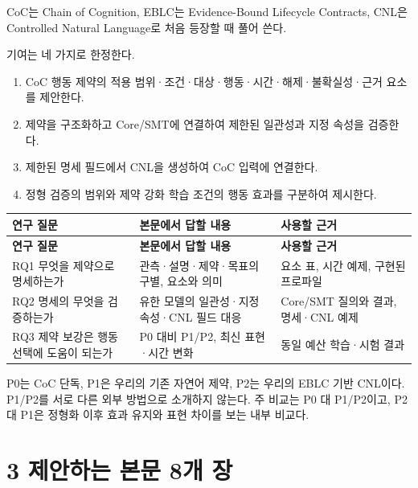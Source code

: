 \documentclass[11pt,a4paper]{article}
\begin{document}
CoC는 Chain of Cognition, EBLC는 Evidence-Bound Lifecycle Contracts, CNL은 Controlled Natural Language로 처음 등장할 때 풀어 쓴다.\par

기여는 네 가지로 한정한다.\par

\begin{enumerate}
\item CoC 행동 제약의 적용 범위·조건·대상·행동·시간·해제·불확실성·근거 요소를 제안한다.
\item 제약을 구조화하고 Core/SMT에 연결하여 제한된 일관성과 지정 속성을 검증한다.
\item 제한된 명세 필드에서 CNL을 생성하여 CoC 입력에 연결한다.
\item 정형 검증의 범위와 제약 강화 학습 조건의 행동 효과를 구분하여 제시한다.
\end{enumerate}

\begingroup\small
\begin{longtable}{@{}>{\raggedright\arraybackslash}p{}>{\raggedright\arraybackslash}p{}>{\raggedright\arraybackslash}p{}@{}}
\toprule
\textbf{연구 질문} & \textbf{본문에서 답할 내용} & \textbf{사용할 근거} \\
\midrule\endfirsthead
\toprule
\textbf{연구 질문} & \textbf{본문에서 답할 내용} & \textbf{사용할 근거} \\
\midrule\endhead
\bottomrule\endfoot
RQ1 무엇을 제약으로 명세하는가 & 관측·설명·제약·목표의 구별, 요소와 의미 & 요소 표, 시간 예제, 구현된 프로파일 \\
RQ2 명세의 무엇을 검증하는가 & 유한 모델의 일관성·지정 속성·CNL 필드 대응 & Core/SMT 질의와 결과, 명세·CNL 예제 \\
RQ3 제약 보강은 행동 선택에 도움이 되는가 & P0 대비 P1/P2, 최신 표현·시간 변화 & 동일 예산 학습·시험 결과 \\
\end{longtable}
\endgroup

P0는 CoC 단독, P1은 우리의 기존 자연어 제약, P2는 우리의 EBLC 기반 CNL이다. P1/P2를 서로 다른 외부 방법으로 소개하지 않는다. 주 비교는 P0 대 P1/P2이고, P2 대 P1은 정형화 이후 효과 유지와 표현 차이를 보는 내부 비교다.\par

\section*{3 제안하는 본문 8개 장}
\end{document}
